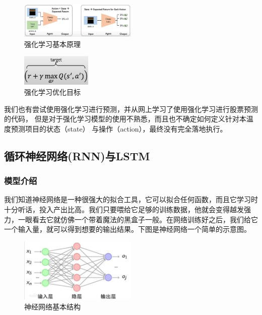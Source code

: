 \documentclass[11pt,a4paper]{elegantpaper}
\begin{document}
\begin{multicols}{2}
\begin{figure}[H]
  \centering
  \includegraphics[width=0.5\textwidth]{images/RL.png}
  \caption{强化学习基本原理} 
\end{figure}

\begin{figure}[H]
  \centering
  \includegraphics[width=0.3\textwidth]{images/RLL.png}
  \caption{强化学习优化目标} 
\end{figure}

我们也有尝试使用强化学习进行预测，并从网上学习了使用强化学习进行股票预测的代码，
但是对于强化学习模型的使用不熟悉，而且也不确定如何定义针对本温度预测项目的状态（state）
与操作（action），最终没有完全落地执行。

\subsection{循环神经网络(RNN)与LSTM}

\subsubsection{模型介绍}

我们知道神经网络是一种很强大的拟合工具，它可以拟合任何函数，而且它学习时十分听话，投入产出比高。我们只要喂给它足够的训练数据，他就会变得越发强力，一眼看去它就仿佛一个带着魔法的黑盒子一般。在网络训练好之后，我们给它一个输入量，就可以得到想要的输出结果。下图是神经网络一个简单的示意图。

\begin{figure}[H]
  \centering
  \includegraphics[width=0.5\textwidth]{images/NN.png}
  \caption{神经网络基本结构} 
\end{figure}


\end{multicols}
\end{document}
